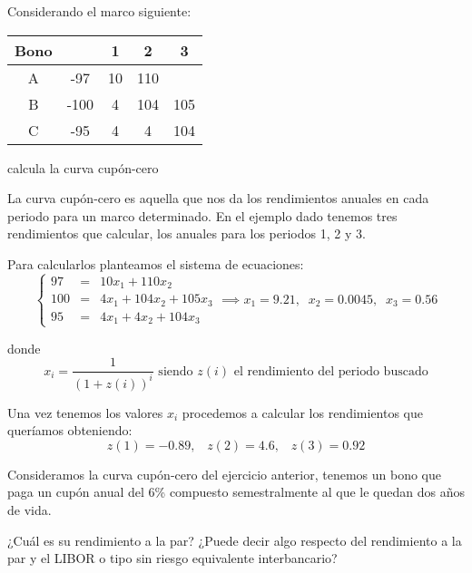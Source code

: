 \begin{problem}[10]
Considerando el marco siguiente:
\begin{center}
\begin{tabular}{|c|c|c|c|c|}
\hline
\textbf{Bono } & & 1 & 2 & 3 \\
\hline
A & -97 & 10 & 110 & \\
B & -100 & 4 & 104 & 105 \\
C & -95 & 4 & 4 & 104 \\
\hline
\end{tabular}
\end{center}
calcula la curva cupón-cero
\solution

La curva cupón-cero es aquella que nos da los rendimientos anuales en cada periodo para un marco determinado. En el ejemplo dado tenemos tres rendimientos que calcular, los anuales para los periodos 1, 2 y 3.

Para calcularlos planteamos el sistema de ecuaciones:
\[\left\{\begin{array}{lll}
97 & = & 10x_1 + 110x_2\\
100 & = & 4x_1 + 104 x_2 + 105x_3\\
95 & = & 4x_1+4x_2 + 104x_3
\end{array}\right. \implies x_1=9.21, \;\; x_2=0.0045, \;\; x_3 = 0.56\]

donde
\[x_i = \frac{1}{(1+z(i))^i} \text{ siendo } z(i) \text{ el rendimiento del periodo buscado}\]

Una vez tenemos los valores $x_i$ procedemos a calcular los rendimientos que queríamos obteniendo:
\[z(1) = -0.89, \;\;\; z(2) = 4.6, \;\;\; z(3) = 0.92\]
\end{problem}

\begin{problem}[11]
Consideramos la curva cupón-cero del ejercicio anterior, tenemos un bono que paga un cupón anual del 6\% compuesto semestralmente al que le quedan dos años de vida.

\ppart ¿Cuál es su rendimiento a la par?
\ppart ¿Puede decir algo respecto del rendimiento a la par y el LIBOR o tipo sin riesgo equivalente interbancario?
\solution


\spart

\end{problem}

